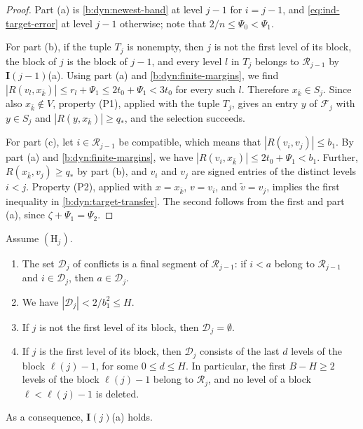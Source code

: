 \begin{proof}
Part (a) is \eqref{b:dyn:newest-band} at level $j-1$ for $i=j-1$, and \eqref{eq:ind-target-error} at level $j-1$ otherwise; note that $2/n\le\Psi_0<\Psi_1$.

For part (b), if the tuple $T_j$ is nonempty, then $j$ is not the first level of its block, the block of $j$ is the block of $j-1$, and every level $l$ in $T_j$ belongs to $\mathcal R_{j-1}$ by $\mathbf I(j-1)$(a). Using part (a) and \eqref{b:dyn:finite-margins}, we find $|R(v_l,x_{\bar k})|\le r_l+\Psi_1\le2t_0+\Psi_1<3t_0$ for every such $l$. Therefore $x_{\bar k}\in S_j$. Since also $x_{\bar k}\notin V$, property (P1), applied with the tuple $T_j$, gives an entry $y$ of $\mathcal F_j$ with $y\in S_j$ and $|R(y,x_{\bar k})|\ge q_*$, and the selection succeeds.

For part (c), let $i\in\mathcal R_{j-1}$ be compatible, which means that $|R(v_i,v_j)|\le b_1$. By part (a) and \eqref{b:dyn:finite-margins}, we have $|R(v_i,x_{\bar k})|\le2t_0+\Psi_1<b_1$. Further, $R(x_{\bar k},v_j)\ge q_*$ by part (b), and $v_i$ and $v_j$ are signed entries of the distinct levels $i<j$. Property (P2), applied with $x=x_{\bar k}$, $v=v_i$, and ${\widetilde v}=v_j$, implies the first inequality in \eqref{b:dyn:target-transfer}. The second follows from the first and part (a), since $\zeta+\Psi_1=\Psi_2$.
\end{proof}

\begin{lemma}\label{lem:ind-deletion}
Assume $(\mathrm H_j)$.
\begin{enumerate}[label=(\alph*)]
\item The set $\mathcal D_j$ of conflicts is a final segment of $\mathcal R_{j-1}$: if $i<a$ belong to $\mathcal R_{j-1}$ and $i\in \mathcal D_j$, then $a\in \mathcal D_j$.
\item We have $|\mathcal D_j|<2/b_1^2\le H$.
\item If $j$ is not the first level of its block, then $\mathcal D_j=\emptyset$.
\item If $j$ is the first level of its block, then $\mathcal D_j$ consists of the last $d$ levels of the block ${\ell}(j)-1$, for some $0\le d\le H$. In particular, the first $B-H\ge2$ levels of the block ${\ell}(j)-1$ belong to $\mathcal R_j$, and no level of a block ${\ell}<{\ell}(j)-1$ is deleted.
\end{enumerate}
As a consequence, $\mathbf I(j)$(a) holds.
\end{lemma}

